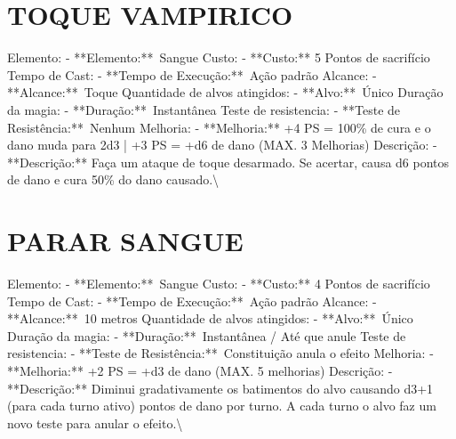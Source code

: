 \documentclass{article}%
\begin{document}
\section{TOQUE VAMPIRICO}%
\label{sec:TOQUEVAMPIRICO}%
Elemento: {-} **Elemento:**~Sangue\newline%
Custo: {-} **Custo:** 5 Pontos de sacrifício\newline%
Tempo de Cast: {-} **Tempo de Execução:**~Ação padrão\newline%
Alcance: {-} **Alcance:**~Toque\newline%
Quantidade de alvos atingidos: {-} **Alvo:**~Único\newline%
Duração da magia: {-} **Duração:**~Instantânea\newline%
Teste de resistencia: {-} **Teste de Resistência:**~Nenhum\newline%
Melhoria: {-} **Melhoria:** +4 PS = 100\% de cura e o dano muda para 2d3 | +3 PS = +d6 de dano (MAX. 3 Melhorias)\newline%
Descrição: {-} **Descrição:** Faça um ataque de toque desarmado. Se acertar, causa d6 pontos de dano e cura 50\% do dano causado.\textbackslash{}

%
\section{PARAR SANGUE}%
\label{sec:PARARSANGUE}%
Elemento: {-} **Elemento:**~Sangue\newline%
Custo: {-} **Custo:** 4 Pontos de sacrifício\newline%
Tempo de Cast: {-} **Tempo de Execução:**~Ação padrão\newline%
Alcance: {-} **Alcance:**~10 metros\newline%
Quantidade de alvos atingidos: {-} **Alvo:**~Único\newline%
Duração da magia: {-} **Duração:**~Instantânea / Até que anule\newline%
Teste de resistencia: {-} **Teste de Resistência:**~Constituição anula o efeito\newline%
Melhoria: {-} **Melhoria:** +2 PS = +d3 de dano (MAX. 5 melhorias)\newline%
Descrição: {-} **Descrição:** Diminui gradativamente os batimentos do alvo causando d3+1 (para cada turno ativo) pontos de dano por turno. A cada turno o alvo faz um novo teste para anular o efeito.\textbackslash{}

%
\end{document}
